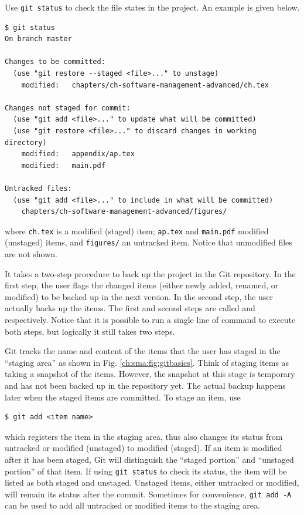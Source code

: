 Use \verb|git status| to check the file states in the project. An example is given below.
\begin{lstlisting}
$ git status
On branch master

Changes to be committed:
  (use "git restore --staged <file>..." to unstage)
	modified:   chapters/ch-software-management-advanced/ch.tex

Changes not staged for commit:
  (use "git add <file>..." to update what will be committed)
  (use "git restore <file>..." to discard changes in working directory)
	modified:   appendix/ap.tex
	modified:   main.pdf

Untracked files:
  (use "git add <file>..." to include in what will be committed)
	chapters/ch-software-management-advanced/figures/
\end{lstlisting}
where \verb|ch.tex| is a modified (staged) item; \verb|ap.tex| and \verb|main.pdf| modified (unstaged) items, and \verb|figures/| an untracked item. Notice that unmodified files are not shown.

It takes a two-step procedure to back up the project in the Git repository. In the first step, the user flags the changed items (either newly added, renamed, or modified) to be backed up in the next version. In the second step, the user actually backs up the items. The first and second steps are called  and  respectively. Notice that it is possible to run a single line of command to execute both steps, but logically it still takes two steps.

Git tracks the name and content of the items that the user has staged in the ``staging area'' as shown in Fig. \ref{ch:sma:fig:gitbasics}. Think of staging items as taking a snapshot of the items. However, the snapshot at this stage is temporary and has not been backed up in the repository yet. The actual backup happens later when the staged items are committed. To stage an item, use
\begin{lstlisting}
$ git add <item name>
\end{lstlisting}
which registers the item in the staging area, thus also changes its status from untracked or modified (unstaged) to modified (staged). If an item is modified after it has been staged, Git will distinguish the ``staged portion'' and ``unstaged portion'' of that item. If using \verb|git status| to check its status, the item will be listed as both staged and unstaged. Unstaged items, either untracked or modified, will remain its status after the commit. Sometimes for convenience, \verb|git add -A| can be used to add all untracked or modified items to the staging area.

